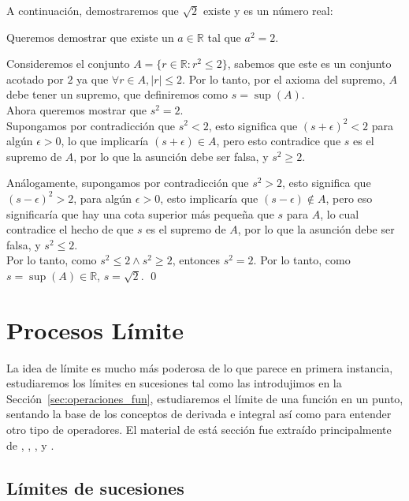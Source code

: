 \documentclass[12pt]{book}
\begin{document}
\begin{exampleenv}

A continuación, demostraremos que $\sqrt{2}$ existe y es un número real:

Queremos demostrar que existe un $a\in \mathbb{R}$ tal que $a^2=2$.

Consideremos el conjunto $A=\{r\in \mathbb{R}:r^2\leq 2\}$, sabemos que este es un conjunto acotado por $2$ ya que $\forall r\in A, |r|\leq 2$. Por lo tanto, por el axioma del supremo, $A$ debe tener un supremo, que definiremos como $s=\sup(A)$.\\

Ahora queremos mostrar que $s^2=2$.\\

Supongamos por contradicción que $s^2<2$, esto significa que $(s+\epsilon)^2<2$ para algún $\epsilon>0$, lo que implicaría $(s+\epsilon)\in A$, pero esto contradice que $s$ es el supremo de $A$, por lo que la asunción debe ser falsa, y $s^2\ge 2$.

Análogamente, supongamos por contradicción que $s^2>2$, esto significa que $(s-\epsilon)^2>2$, para algún $\epsilon>0$, esto implicaría que $(s-\epsilon)\notin A$, pero eso significaría que hay una cota superior más pequeña que $s$ para $A$, lo cual contradice el hecho de que $s$ es el supremo de $A$, por lo que la asunción debe ser falsa, y $s^2\leq 2$.\\

Por lo tanto, como $s^2\leq2 \wedge s^2\ge 2$, entonces $s^2=2$. Por lo tanto, como $s=\sup(A)\in \mathbb{R}$, $s=\sqrt{2}$. \qed
\end{exampleenv}

\section{Procesos Límite}
\noindent
La idea de límite es mucho más poderosa de lo que parece en primera instancia, estudiaremos los límites en sucesiones tal como las introdujimos en la Sección~\ref{sec:operaciones_fun}, estudiaremos el límite de una función en un punto, sentando la base de los conceptos de derivada e integral así como para entender otro tipo de operadores. El material de está sección fue extraído principalmente de \cite[Chapter 2]{abbott2015understanding}, \cite[Chapter 4]{abbott2015understanding}, \cite[Chapter 6]{tao2006analysis}, y \cite[Chapter 5]{spivak2006calculus}.

\subsection{Límites de sucesiones}
\end{document}
